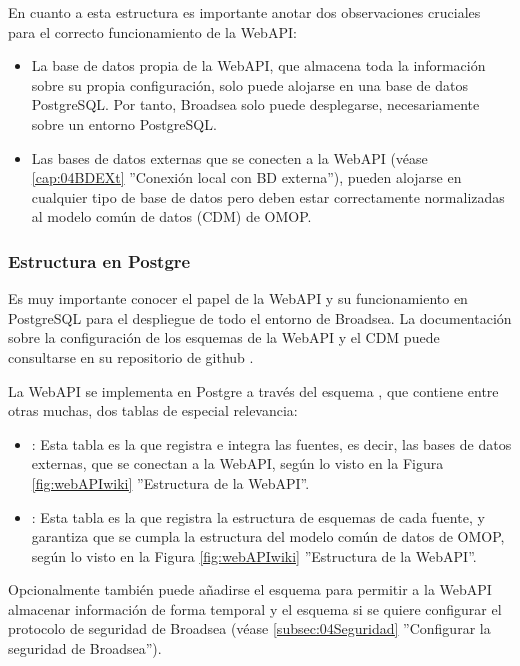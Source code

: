 En cuanto a esta estructura es importante anotar dos observaciones cruciales para el correcto funcionamiento de la WebAPI:

\begin{itemize}
     \item La base de datos propia de la WebAPI, que almacena toda la información sobre su propia configuración, solo puede alojarse en una base de datos PostgreSQL. Por tanto, Broadsea solo puede desplegarse, necesariamente sobre un entorno PostgreSQL.
    \item Las bases de datos externas que se conecten a la WebAPI (véase \ref{cap:04BDEXt} ''Conexión local con BD externa''), pueden alojarse en cualquier tipo de base de datos pero deben estar correctamente normalizadas al modelo común de datos (CDM) de OMOP. 

\end{itemize}

\subsubsection{Estructura en Postgre}

Es muy importante conocer el papel de la WebAPI y su funcionamiento en PostgreSQL para el despliegue de todo el entorno de Broadsea. La documentación sobre la configuración de los esquemas de la WebAPI y el CDM puede consultarse en su repositorio de github \parencite{githubCDMConfig}.

La WebAPI se implementa en Postgre a través del esquema , que contiene entre otras muchas, dos tablas de especial relevancia: 

\begin{itemize}
    \item \textbf{}: Esta tabla es la que registra e integra las fuentes, es decir, las bases de datos externas, que se conectan a la WebAPI, según lo visto en la Figura \ref{fig:webAPIwiki} ''Estructura de la WebAPI''.
    \item \textbf{}: Esta tabla es la que registra la estructura de esquemas de cada fuente, y garantiza que se cumpla la estructura del modelo común de datos de OMOP, según lo visto en la Figura \ref{fig:webAPIwiki} ''Estructura de la WebAPI''.
\end{itemize}

Opcionalmente también puede añadirse el esquema  para permitir a la WebAPI almacenar información de forma temporal y el esquema  si se quiere configurar el protocolo de seguridad de Broadsea (véase \ref{subsec:04Seguridad} ''Configurar la seguridad de Broadsea'').

